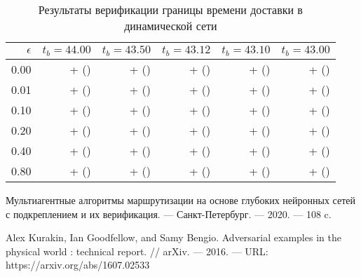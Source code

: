 \documentclass[a4paper]{article}
\begin{document}
\begin{table}[H]
\caption{Результаты верификации границы времени доставки в динамической сети}
\label{res2}
\centering
\begin{tabular}{rrrrrr}
    \\
    \toprule
    $\epsilon$ &
    $t_b = 44.00$ &
    $t_b = 43.50$ &
    $t_b = 43.12$ &
    $t_b = 43.10$ &
    $t_b = 43.00$ \\
    \midrule
    0.00 & + () & + () & + () & + () & + () \\
    0.01 & + () & + () & + () & + () & + () \\
    0.10 & + () & + () & + () & + () & + () \\
    0.20 & + () & + () & + () & + () & + () \\
    0.40 & + () & + () & + () & + () & + () \\
    0.80 & + () & + () & + () & + () & + () \\
    \bottomrule
\end{tabular}
\end{table}

\begin{thebibliography}{3}
        Мультиагентные алгоритмы маршрутизации на основе глубоких нейронных
        сетей с подкреплением и их верификация. --- Санкт-Петербург. --- 2020.
        --- 108 c.

        Alex Kurakin, Ian Goodfellow, and Samy Bengio. Adversarial examples in
        the physical world : technical report. // arXiv. --- 2016. --- URL:
        https://arxiv.org/abs/1607.02533
\end{thebibliography}
\end{document}
